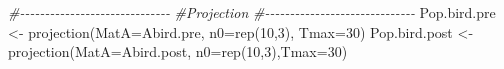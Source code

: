\documentclass[
]{book}
\newenvironment{Shaded}{\begin{snugshade}}{\end{snugshade}}
\newcommand{\AttributeTok}[1]{\textcolor[rgb]{0.77,0.63,0.00}{#1}}
\newcommand{\CommentTok}[1]{\textcolor[rgb]{0.56,0.35,0.01}{\textit{#1}}}
\newcommand{\DecValTok}[1]{\textcolor[rgb]{0.00,0.00,0.81}{#1}}
\newcommand{\FunctionTok}[1]{\textcolor[rgb]{0.00,0.00,0.00}{#1}}
\newcommand{\NormalTok}[1]{#1}
\newcommand{\OtherTok}[1]{\textcolor[rgb]{0.56,0.35,0.01}{#1}}
\begin{document}
\begin{Shaded}
\begin{Highlighting}[]
\CommentTok{\#{-}{-}{-}{-}{-}{-}{-}{-}{-}{-}{-}{-}{-}{-}{-}{-}{-}{-}{-}{-}{-}{-}{-}{-}{-}{-}{-}{-}{-}{-}}
\CommentTok{\#Projection }
\CommentTok{\#{-}{-}{-}{-}{-}{-}{-}{-}{-}{-}{-}{-}{-}{-}{-}{-}{-}{-}{-}{-}{-}{-}{-}{-}{-}{-}{-}{-}{-}{-}}
\NormalTok{Pop.bird.pre }\OtherTok{\textless{}{-}} \FunctionTok{projection}\NormalTok{(}\AttributeTok{MatA=}\NormalTok{Abird.pre, }\AttributeTok{n0=}\FunctionTok{rep}\NormalTok{(}\DecValTok{10}\NormalTok{,}\DecValTok{3}\NormalTok{), }\AttributeTok{Tmax=}\DecValTok{30}\NormalTok{)}
\NormalTok{Pop.bird.post }\OtherTok{\textless{}{-}} \FunctionTok{projection}\NormalTok{(}\AttributeTok{MatA=}\NormalTok{Abird.post, }\AttributeTok{n0=}\FunctionTok{rep}\NormalTok{(}\DecValTok{10}\NormalTok{,}\DecValTok{3}\NormalTok{),}\AttributeTok{Tmax=}\DecValTok{30}\NormalTok{)}
\end{Highlighting}
\end{Shaded}


  
\end{document}

